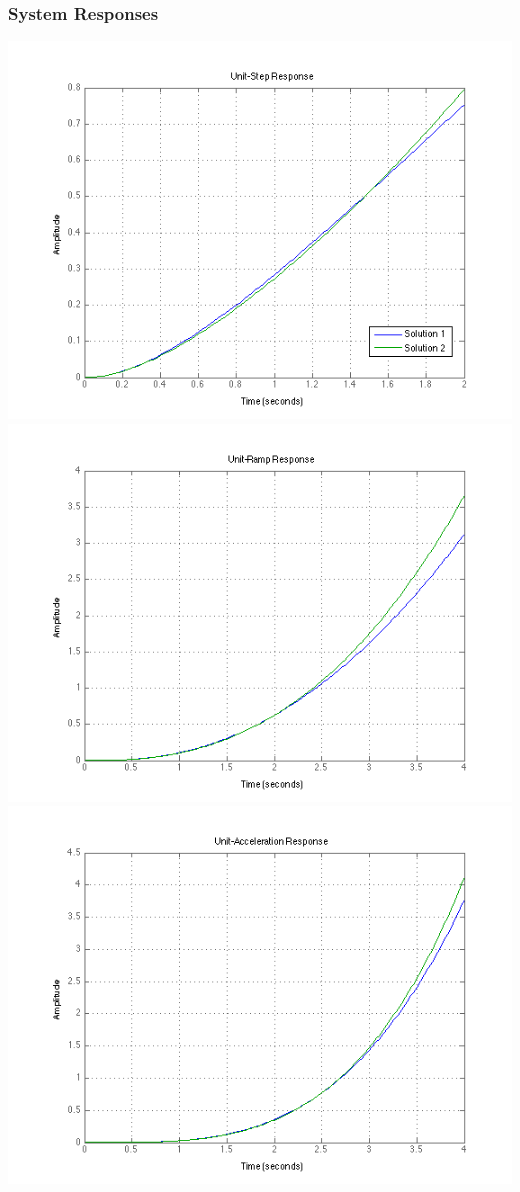 \documentclass[letterpaper,10pt]{article}
\begin{document}
\subsubsection*{System Responses}

\begin{center}
	\includegraphics[scale=0.65]{2-unit-step.png} \\
	\includegraphics[scale=0.65]{2-unit-ramp.png} \\
	\includegraphics[scale=0.65]{2-unit-accel.png}

\end{center}
\end{document}
